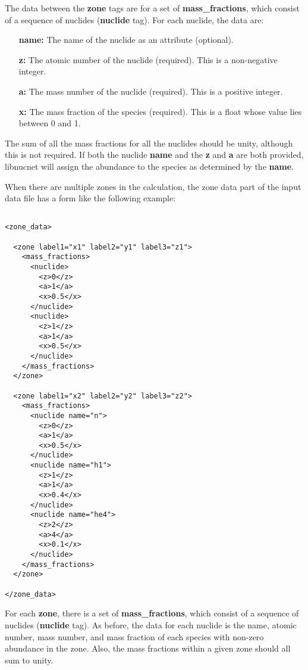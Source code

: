 \documentclass{article}    %
\begin{document}
The data between the {\bf zone} tags are for a set of {\bf mass\_fractions},
which consist of a sequence of
nuclides ({\bf nuclide} tag).  For each nuclide, the data are:
\begin{itemize}
\item[{\bf name:}] The name of the nuclide as an attribute (optional).
\item[{\bf z:}] The atomic number of the nuclide (required).  This
is a non-negative integer.
\item[{\bf a:}] The mass number of the nuclide (required).  This is
a positive integer.
\item[{\bf x:}] The mass fraction of the species (required).  This
is a float whose value lies between 0 and 1.
\end{itemize}
The sum of all the mass fractions for all the nuclides should be
unity, although this is not required.  If both the nuclide {\bf name} and the
{\bf z} and {\bf a} are both provided, libnucnet will assign the abundance
to the species as determined by the {\bf name}.

When there are multiple zones in the calculation, the zone data
part of the input data file has a form like the following
example:

\begin{verbatim}

<zone_data>

  <zone label1="x1" label2="y1" label3="z1">
    <mass_fractions>
      <nuclide>
        <z>0</z>
        <a>1</a>
        <x>0.5</x>
      </nuclide>
      <nuclide>
        <z>1</z>
        <a>1</a>
        <x>0.5</x>
      </nuclide>
    </mass_fractions>
  </zone>

  <zone label1="x2" label2="y2" label3="z2">
    <mass_fractions>
      <nuclide name="n">
        <z>0</z>
        <a>1</a>
        <x>0.5</x>
      </nuclide>
      <nuclide name="h1">
        <z>1</z>
        <a>1</a>
        <x>0.4</x>
      </nuclide>
      <nuclide name="he4">
        <z>2</z>
        <a>4</a>
        <x>0.1</x>
      </nuclide>
    </mass_fractions>
  </zone>

</zone_data>

\end{verbatim}

For each {\bf zone}, there is a set of {\bf mass\_fractions},
which consist of a sequence of nuclides ({\bf nuclide} tag).  As before,
the data for each nuclide is the name, atomic number, mass number, and mass
fraction of each species with non-zero abundance in the zone.
Also, the mass fractions within a given zone should all sum to unity.
\end{document}
